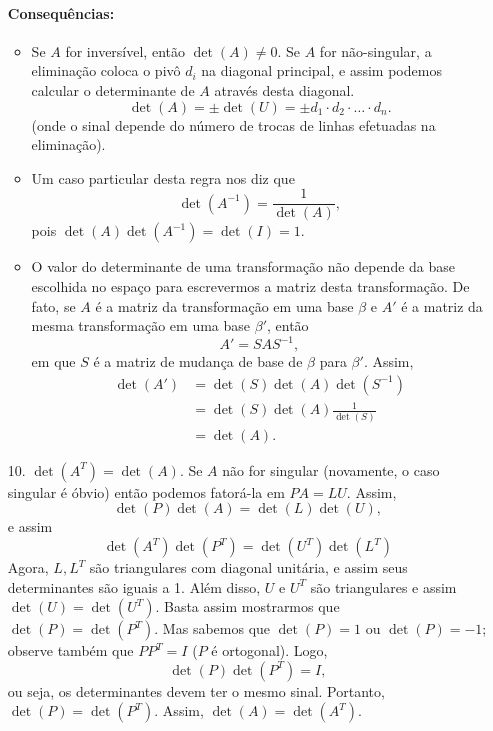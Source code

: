\begin{itemize}
\paragraph*{Consequências:} 
\begin{itemize}
	\item Se $A$ for inversível, então $\det(A)\ne 0$. Se $A$ for não-singular, a eliminação coloca o pivô $d_i$ na diagonal principal, e assim podemos calcular o determinante de $A$ através desta diagonal.
\begin{equation*}
  \det(A) = \pm \det(U) = \pm d_1\cdot d_2\cdot \ldots \cdot d_n.
\end{equation*}
(onde o sinal depende do número de trocas de linhas efetuadas na eliminação).
\item Um caso particular desta regra nos diz que 
\begin{equation*}
  \det(A^{-1}) = \frac{1}{\det(A)},
\end{equation*}
pois $\det(A)\det(A^{-1}) = \det(I)=1$.
\item O valor do determinante de uma transformação não depende da base escolhida no espaço para escrevermos a matriz desta transformação. De fato, se $A$ é a matriz da transformação em uma base $\beta$ e $A'$ é a matriz da mesma transformação em uma base $\beta'$, então
\begin{equation*}
A' = SAS^{-1},
\end{equation*}
em que $S$ é a matriz de mudança de base de $\beta$ para $\beta'$. Assim,
\begin{align*}
	\det(A') &= \det(S)\det(A)\det(S^{-1})\\
    &= \det(S) \det(A) \frac{1}{\det(S)}\\
    &= \det(A).
\end{align*}
\end{itemize}

\item[10.] $\det(A^T) = \det(A)$.
Se $A$ não for singular (novamente, o caso singular é óbvio) então podemos fatorá-la em $PA=LU$. Assim,
\begin{equation*}
  \det(P)\det(A) = \det(L)\det(U),
\end{equation*}
e assim
\begin{equation*}
  \det(A^T) \det(P^T) = \det(U^T)\det(L^T)
\end{equation*}
Agora, $L, L^T$ são triangulares com diagonal unitária, e assim seus determinantes são iguais a 1. Além disso, $U$ e $U^T$ são triangulares e assim $\det(U)=\det(U^T)$. Basta assim mostrarmos que $\det(P)=\det(P^T)$. Mas sabemos que $\det(P)=1$ ou $\det(P)=-1$; observe também que $PP^T=I$ ($P$ é ortogonal). Logo,
\begin{equation*}
   \det(P)\det(P^T)=I,
\end{equation*}
ou seja, os determinantes devem ter o mesmo sinal. Portanto, $\det(P)=\det(P^T)$. Assim, $\det(A)=\det(A^T)$.


\end{itemize}
